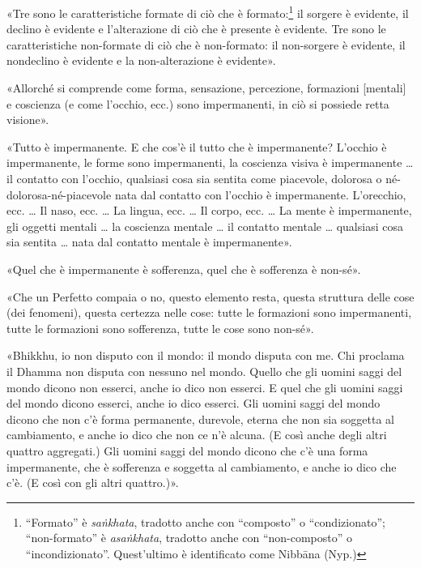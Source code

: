  «Tre sono le caratteristiche formate di ciò che è
formato:\footnote{“Formato” è \emph{saṅkhata}, tradotto anche con “composto” o
  “condizionato”; “non-formato” è \emph{asaṅkhata}, tradotto anche con
  “non-composto” o “incondizionato”. Quest’ultimo è identificato come Nibbāna
  (Nyp.)} il sorgere è evidente, il declino è evidente e l’alterazione di ciò
che è presente è evidente. Tre sono le caratteristiche non-formate di ciò che è
non-formato: il non-sorgere è evidente, il nondeclino è evidente e la
non-alterazione è evidente».


«Allorché si comprende come forma, sensazione, percezione, formazioni [mentali]
e coscienza (e come l’occhio, ecc.) sono impermanenti, in ciò si possiede retta
visione».


«Tutto è impermanente. E che cos’è il tutto che è impermanente? L’occhio è
impermanente, le forme sono impermanenti, la coscienza visiva è impermanente …
il contatto con l’occhio, qualsiasi cosa sia sentita come piacevole, dolorosa o
né-dolorosa-né-piacevole nata dal contatto con l’occhio è impermanente.
L’orecchio, ecc. … Il naso, ecc. … La lingua, ecc. … Il corpo, ecc. … La mente è
impermanente, gli oggetti mentali … la coscienza mentale … il contatto mentale …
qualsiasi cosa sia sentita … nata dal contatto mentale è impermanente».


«Quel che è impermanente è sofferenza, quel che è sofferenza è non-sé».


«Che un Perfetto compaia o no, questo elemento resta, questa struttura delle
cose (dei fenomeni), questa certezza nelle cose: tutte le formazioni sono
impermanenti, tutte le formazioni sono sofferenza, tutte le cose sono non-sé».


«Bhikkhu, io non disputo con il mondo: il mondo disputa con me. Chi proclama il
Dhamma non disputa con nessuno nel mondo. Quello che gli uomini saggi del mondo
dicono non esserci, anche io dico non esserci. E quel che gli uomini saggi del
mondo dicono esserci, anche io dico esserci. Gli uomini saggi del mondo dicono
che non c’è forma permanente, durevole, eterna che non sia soggetta al
cambiamento, e anche io dico che non ce n’è alcuna. (E così anche degli altri
quattro aggregati.) Gli uomini saggi del mondo dicono che c’è una forma
impermanente, che è sofferenza e soggetta al cambiamento, e anche io dico che
c’è. (E così con gli altri quattro.)».

